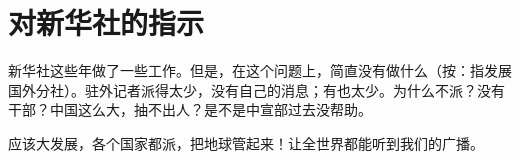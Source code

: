 \section[对新华社的指示（一九五九年十二月）]{对新华社的指示}


新华社这些年做了一些工作。但是，在这个问题上，简直没有做什么（按：指发展国外分社）。驻外记者派得太少，没有自己的消息；有也太少。为什么不派？没有干部？中国这么大，抽不出人？是不是中宣部过去没帮助。

应该大发展，各个国家都派，把地球管起来！让全世界都能听到我们的广播。


